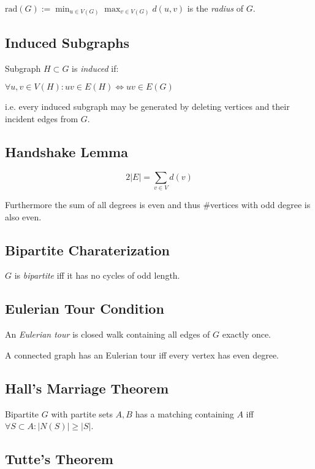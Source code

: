 \spacing

$\text{rad}(G) := \displaystyle\min_{u \in V(G)} \max_{v \in V(G)} d(u,v)$ is the \emph{radius} of $G$.

\subsection*{Induced Subgraphs}

Subgraph $H \subset G$ is \emph{induced} if:

$\forall u, v \in V(H) : uv \in E(H) \iff uv \in E(G)$

i.e. every induced subgraph may be generated by deleting vertices and their incident edges from $G$.

\subsection*{Handshake Lemma}

$$2|E| = \sum_{v \in V} d(v)$$

Furthermore the sum of all degrees is even and thus \#vertices with odd degree is also even.

\subsection*{Bipartite Charaterization}

$G$ is \emph{bipartite} iff it has no cycles of odd length.

\subsection*{Eulerian Tour Condition}

An \emph{Eulerian tour} is closed walk containing all edges of $G$ exactly once.

\spacing

A connected graph has an Eulerian tour iff every vertex has even degree.

\subsection*{Hall's Marriage Theorem}

Bipartite $G$ with partite sets $A, B$ has a matching containing $A$ iff $\forall S \subset A : |N(S)|\geq|S|$.

\subsection*{Tutte's Theorem}

